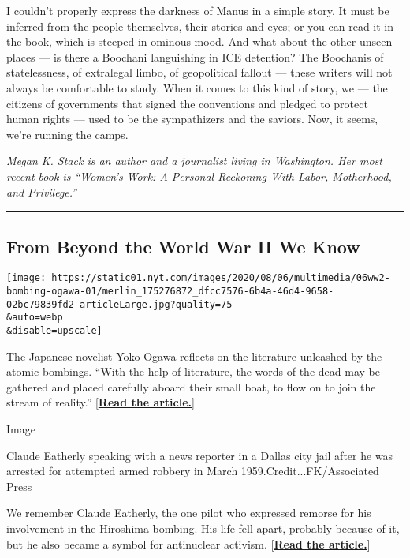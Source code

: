 I couldn't properly express the darkness of Manus in a simple story. It
must be inferred from the people themselves, their stories and eyes; or
you can read it in the book, which is steeped in ominous mood. And what
about the other unseen places --- is there a Boochani languishing in ICE
detention? The Boochanis of statelessness, of extralegal limbo, of
geopolitical fallout --- these writers will not always be comfortable to
study. When it comes to this kind of story, we --- the citizens of
governments that signed the conventions and pledged to protect human
rights --- used to be the sympathizers and the saviors. Now, it seems,
we're running the camps.

\emph{Megan K. Stack is an author and a journalist living in Washington.
Her most recent book is ``Women's Work: A Personal Reckoning With Labor,
Motherhood, and Privilege.''}

\begin{center}\rule{0.5\linewidth}{\linethickness}\end{center}

\hypertarget{from-beyond-the-world-war-ii-we-know}{%
\subsection{From Beyond the World War II We
Know}\label{from-beyond-the-world-war-ii-we-know}}

\texttt{[image: https://static01.nyt.com/images/2020/08/06/multimedia/06ww2-bombing-ogawa-01/merlin\_175276872\_dfcc7576-6b4a-46d4-9658-02bc79839fd2-articleLarge.jpg?quality=75\\\&auto=webp\\\&disable=upscale]}

The Japanese novelist Yoko Ogawa reflects on the literature unleashed by
the atomic bombings. ``With the help of literature, the words of the
dead may be gathered and placed carefully aboard their small boat, to
flow on to join the stream of reality.''
{[}\textbf{\href{https://www.nytimes.com/2020/08/06/magazine/hiroshima-nagasaki-japan-literature.html}{Read
the article.}}{]}

Image

Claude Eatherly speaking with a news reporter in a Dallas city jail
after he was arrested for attempted armed robbery in March
1959.Credit...FK/Associated Press

We remember Claude Eatherly, the one pilot who expressed remorse for his
involvement in the Hiroshima bombing. His life fell apart, probably
because of it, but he also became a symbol for antinuclear activism.
{[}\textbf{\href{https://www.nytimes.com/2020/08/06/magazine/hiroshima-claude-eatherly-antinuclear.html}{Read
the article.}}{]}

